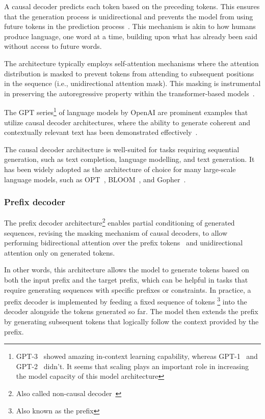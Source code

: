 A causal decoder predicts each token based on the preceding tokens.
This ensures that the generation process is unidirectional and prevents the model from using future tokens in the prediction process~\cite{vaswani2023attention}.
This mechanism is akin to how humans produce language, one word at a time, building upon what has already been said without access to future words.

The architecture typically employs self-attention mechanisms where the attention distribution is masked to prevent tokens from attending to subsequent positions in the sequence (i.e., unidirectional attention mask).
This masking is instrumental in preserving the autoregressive property within the transformer-based models~\cite{radford2019language}.

The GPT series\footnote{GPT-3~\cite{brown2020language} showed amazing in-context learning capability, whereas GPT-1~\cite{radford2018improving} and GPT-2~\cite{radford2019language} didn't. It seems that scaling plays an important role in increasing the model capacity of this model architecture} of language models by OpenAI are prominent examples that utilize causal decoder architectures, where the ability to generate coherent and contextually relevant text has been demonstrated effectively~\cite{brown2020language}.

The causal decoder architecture is well-suited for tasks requiring sequential generation, such as text completion, language modelling, and text generation.
It has been widely adopted as the architecture of choice for many large-scale language models, such as OPT~\cite{zhang2022opt}, BLOOM~\cite{workshop2023bloom}, and Gopher~\cite{rae2021scaling}.

\subsubsection{Prefix decoder}
\label{subsec:prefix-decoder}

The prefix decoder architecture\footnote{Also called non-causal decoder~\cite{zhang2022examining}} enables partial conditioning of generated sequences, revising the masking mechanism of causal decoders, to allow performing bidirectional attention over the prefix tokens~\cite{dong2019unified} and unidirectional attention only on generated tokens.

In other words, this architecture allows the model to generate tokens based on both the input prefix and the target prefix, which can be helpful in tasks that require generating sequences with specific prefixes or constraints.
In practice, a prefix decoder is implemented by feeding a fixed sequence of tokens \footnote{Also known as the prefix} into the decoder alongside the tokens generated so far.
The model then extends the prefix by generating subsequent tokens that logically follow the context provided by the prefix.

